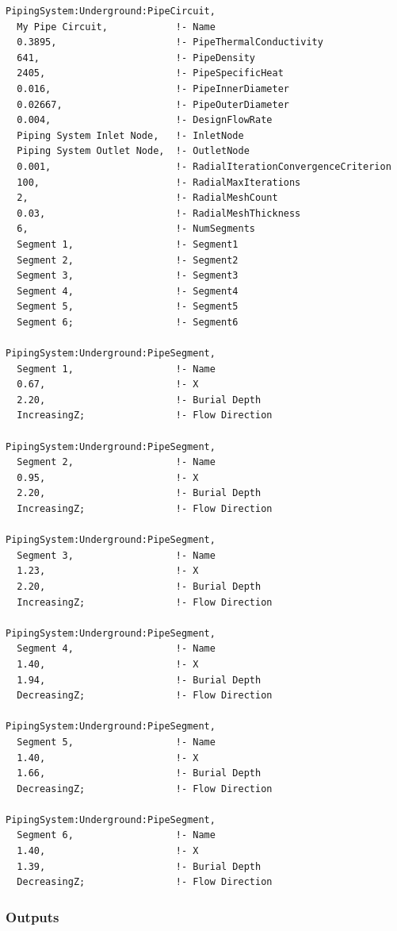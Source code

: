 \begin{lstlisting}
PipingSystem:Underground:PipeCircuit,
  My Pipe Circuit,            !- Name
  0.3895,                     !- PipeThermalConductivity
  641,                        !- PipeDensity
  2405,                       !- PipeSpecificHeat
  0.016,                      !- PipeInnerDiameter
  0.02667,                    !- PipeOuterDiameter
  0.004,                      !- DesignFlowRate
  Piping System Inlet Node,   !- InletNode
  Piping System Outlet Node,  !- OutletNode
  0.001,                      !- RadialIterationConvergenceCriterion
  100,                        !- RadialMaxIterations
  2,                          !- RadialMeshCount
  0.03,                       !- RadialMeshThickness
  6,                          !- NumSegments
  Segment 1,                  !- Segment1
  Segment 2,                  !- Segment2
  Segment 3,                  !- Segment3
  Segment 4,                  !- Segment4
  Segment 5,                  !- Segment5
  Segment 6;                  !- Segment6

PipingSystem:Underground:PipeSegment,
  Segment 1,                  !- Name
  0.67,                       !- X
  2.20,                       !- Burial Depth
  IncreasingZ;                !- Flow Direction

PipingSystem:Underground:PipeSegment,
  Segment 2,                  !- Name
  0.95,                       !- X
  2.20,                       !- Burial Depth
  IncreasingZ;                !- Flow Direction

PipingSystem:Underground:PipeSegment,
  Segment 3,                  !- Name
  1.23,                       !- X
  2.20,                       !- Burial Depth
  IncreasingZ;                !- Flow Direction

PipingSystem:Underground:PipeSegment,
  Segment 4,                  !- Name
  1.40,                       !- X
  1.94,                       !- Burial Depth
  DecreasingZ;                !- Flow Direction

PipingSystem:Underground:PipeSegment,
  Segment 5,                  !- Name
  1.40,                       !- X
  1.66,                       !- Burial Depth
  DecreasingZ;                !- Flow Direction

PipingSystem:Underground:PipeSegment,
  Segment 6,                  !- Name
  1.40,                       !- X
  1.39,                       !- Burial Depth
  DecreasingZ;                !- Flow Direction
\end{lstlisting}

\subsubsection{Outputs}\label{outputs-9-004}

